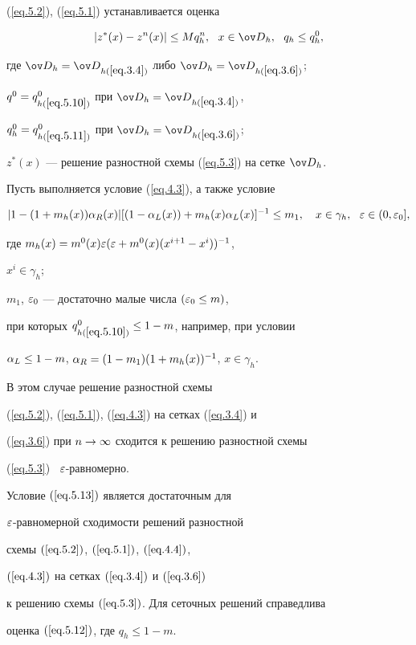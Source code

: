 (\ref{eq.5.2}), (\ref{eq.5.1}) устанавливается оценка


\begin{equation} \label{eq.5.12}


|z^*(x)-z^n(x)|\leq M q^n_h, \ \ x\in\od_h, \ \ q_h\leq q^0_h,


\end{equation}


где $\od_h=\od_{h(\ref{eq.3.4})}$ либо $\od_h=\od_{h(\ref{eq.3.6})}$;


$q^0=q^0_{h(\ref{eq.5.10})}$ при $\od_h=\od_{h(\ref{eq.3.4})}$,


$q^0_h=q^0_{h(\ref{eq.5.11})}$ при $\od_h=\od_{h(\ref{eq.3.6})}$;


$z^*(x)$ --- решение разностной схемы (\ref{eq.5.3}) на сетке $\od_h$.





Пусть выполняется условие (\ref{eq.4.3}), а также условие


\begin{equation}


\label{eq.5.13}


|1-(1+m_h(x))\al_R(x)| [(1-\al_L(x))+


m_h(x)\al_L(x)]^{-1} \leq m_1,\quad


x\in\gamma_h, \ \ \eps\in (0,\eps_0], 


\end{equation}


где $m_h(x)=m^0(x)\varepsilon(\varepsilon+m^0(x)(x^{i+1}-x^i))^{-1}$,


$x^{i} \in \gamma_h$;


$m_1$, $\varepsilon_0$ --- достаточно малые числа $(\varepsilon_0\leq m)$,


при которых $q^0_{h(\ref{eq.5.10})}\leq 1-m$, например, при условии


$\alpha_L \leq 1-m$, $\alpha_R=(1-m_1)(1+m_h(x))^{-1}$, $x \in \gamma_h$.


В этом случае решение разностной схемы


(\ref{eq.5.2}), (\ref{eq.5.1}), (\ref{eq.4.3}) на сетках (\ref{eq.3.4}) и


(\ref{eq.3.6}) при $n\rightarrow\infty$ сходится к решению разностной схемы


(\ref{eq.5.3}) \ $\varepsilon$-равномерно.





\begin{thms} \label{t.5.2}


Условие $(\ref{eq.5.13})$ является достаточным для


$\varepsilon$-равномерной сходимости решений разностной


схемы $(\ref{eq.5.2})$, $(\ref{eq.5.1})$, $(\ref{eq.4.4})$,


$(\ref{eq.4.3})$ на сетках $(\ref{eq.3.4})$ и $(\ref{eq.3.6})$


к решению схемы $(\ref{eq.5.3})$. Для сеточных решений справедлива


оценка $(\ref{eq.5.12})$, где $q_h\leq 1-m$.


\end{thms}





